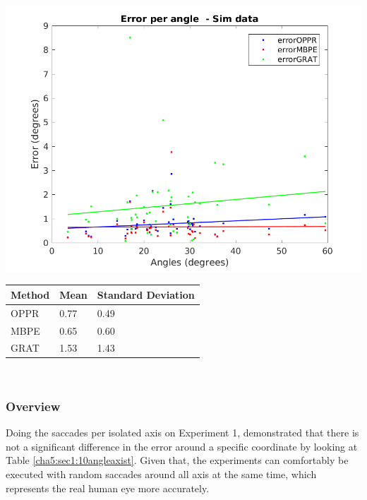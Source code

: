 \begin{minipage}{0.5\textwidth}
	\centering
	\includegraphics[width=\textwidth]{images/sim/45angle.png}
	\label{cha5:sec1:45angle}
\end{minipage}
\begin{minipage}{0.5\textwidth}
	\centering
	\begin{tabular}{| l | l | l |}
		\hline
		Method & Mean & Standard Deviation \\
		\hline
		OPPR &  0.77 \degree & 0.49 \degree \\
		\hline
		MBPE &  0.65 \degree & 0.60 \degree \\
		\hline
		GRAT &  1.53 \degree & 1.43 \degree \\ 
		\hline
	\end{tabular}
	\label{cha5:sec1:45anglet}
\end{minipage}\\

\subsubsection{Overview}

Doing the saccades per isolated axis on Experiment 1, demonstrated that there is not a significant difference in the error around a specific coordinate by looking at Table \ref{cha5:sec1:10angleaxist}. Given that, the experiments can comfortably be executed with random saccades around all axis at the same time, which represents the real human eye more accurately.

